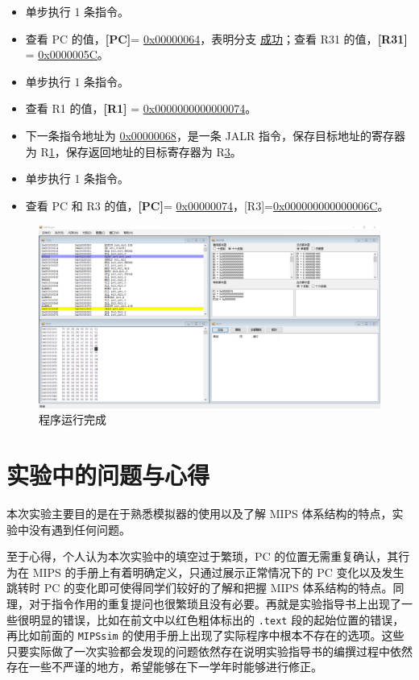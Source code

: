 \documentclass[blue,normal,cn]{elegantnote}
\newcommand{\code}[1]{\colorbox{light-gray}{\texttt{#1}}}
\begin{document}
\begin{enumerate}[wide=0pt, listparindent=2em, parsep=0pt]
\begin{itemize}[leftmargin=3em]
              \item 单步执行 1 条指令。
              \item 查看 PC 的值，\textbf{[PC]}= \uline{0x00000064}，表明分支 \uline{成功}；查看 R31 的值，\textbf{[R31]} = \uline{0x0000005C}。
              \item 单步执行 1 条指令。
              \item 查看 R1 的值，\textbf{[R1]} = \uline{0x0000000000000074}。
              \item 下一条指令地址为 \uline{0x00000068}，是一条 JALR 指令，保存目标地址的寄存器为 R\uline{1}，保存返回地址的目标寄存器为 R\uline{3}。
              \item 单步执行 1 条指令。
              \item 查看 PC 和 R3 的值，\textbf{[PC]}= \uline{0x00000074}，[R3]=\uline{0x000000000000006C}。
          \end{itemize}
          \begin{figure}[H]
              \centering
              \includegraphics[width=1\textwidth]{fig/fin_alltest.png}
              \caption{程序运行完成}
              \label{fig:fin_alltest}
          \end{figure}
\end{enumerate}

\section{实验中的问题与心得}

本次实验主要目的是在于熟悉模拟器的使用以及了解 MIPS 体系结构的特点，实验中没有遇到任何问题。

至于心得，个人认为本次实验中的填空过于繁琐，PC 的位置无需重复确认，其行为在 MIPS 的手册上有着明确定义，只通过展示正常情况下的 PC 变化以及发生跳转时 PC 的变化即可使得同学们较好的了解和把握 MIPS 体系结构的特点。同理，对于指令作用的重复提问也很繁琐且没有必要。再就是实验指导书上出现了一些很明显的错误，比如在前文中以红色粗体标出的 \code{.text} 段的起始位置的错误，再比如前面的 \code{MIPSsim} 的使用手册上出现了实际程序中根本不存在的选项。这些只要实际做了一次实验都会发现的问题依然存在说明实验指导书的编撰过程中依然存在一些不严谨的地方，希望能够在下一学年时能够进行修正。
\end{document}
